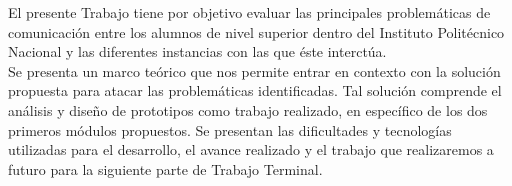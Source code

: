 El presente Trabajo tiene por objetivo evaluar las principales problemáticas de comunicación entre los alumnos de nivel superior dentro del Instituto Politécnico Nacional y las diferentes instancias con las que éste interctúa. \\
Se presenta un marco teórico que nos permite entrar en contexto con la solución propuesta para atacar las problemáticas identificadas. Tal solución comprende el análisis y diseño de prototipos como trabajo realizado, en específico de los dos primeros módulos propuestos. Se presentan las dificultades y tecnologías utilizadas para el desarrollo, el avance realizado y el trabajo que realizaremos a futuro para la siguiente parte de Trabajo Terminal.

	
    
	
	
	 



